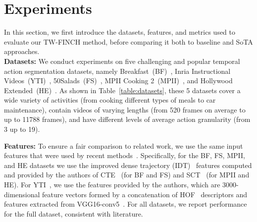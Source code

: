 \documentclass[10pt,twocolumn,letterpaper]{article}
\begin{document}
 \section{Experiments}
\label{sec:exp}
In this section, we first introduce the datasets, features, and metrics used to evaluate our TW-FINCH method, before comparing it both to baseline and SoTA approaches.\\


\noindent\textbf{Datasets:} We conduct experiments on five challenging and popular temporal action segmentation datasets, namely Breakfast~(BF)~\cite{ute_15}, Inria Instructional Videos~(YTI)~\cite{yti_paper}, 50Salads~(FS)~\cite{fs_paper}, MPII Cooking 2~(MPII)~\cite{mpii_paper}, and Hollywood Extended~(HE)~\cite{he_paper}. As shown in Table~\ref{table:datasets}, these 5 datasets cover a wide variety of activities (from cooking different types of meals to car maintenance), contain videos of varying lengths (from 520 frames on average to up to 11788 frames), and have different levels of average action granularity (from 3 up to 19).


\begin{table}[t!]
\vspace{0.3cm}
\centering
{}
\caption{Statistics of datasets used in the experiments: Background refers to the \% of background frames in a dataset.\label{table:datasets}}
\vspace{-0.3cm}
\end{table}


\noindent\textbf{Features:} To ensure a fair comparison to related work, we use the same input features that were used by recent methods~\cite{ute_paper,mallow,sct,cdfl,actionset}.
Specifically, for the BF, FS, MPII, and HE datasets we use the improved dense trajectory (IDT)~\cite{idt} features computed and provided by the authors of CTE~\cite{ute_paper} (for BF and FS) and SCT~\cite{sct} (for MPII and HE).
For YTI~\cite{yti_paper}, we use the features provided by the authors, which are 3000-dimensional feature vectors formed by a concatenation of HOF~\cite{hof} descriptors and features extracted from VGG16-conv5~\cite{vgg}.
For all datasets, we report performance for the full dataset, consistent with literature. 
\end{document}
